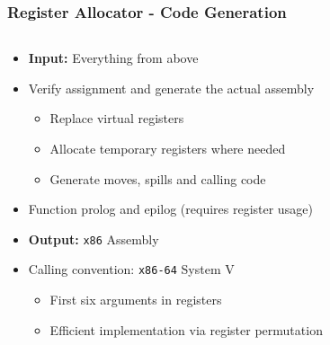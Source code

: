 \documentclass[navbaroff,en]{sdqbeamer}
\begin{document}
\begin{frame}
\frametitle{Register Allocator - Code Generation}

\begin{columns}
	\begin{column}{0.7\textwidth}
		\begin{itemize}
			\item \textbf{Input:} Everything from above
			\item Verify assignment and generate the actual assembly
			\begin{itemize}
				\item Replace virtual registers
				\item Allocate temporary registers where needed
				\item Generate moves, spills and calling code
			\end{itemize}
			\item Function prolog and epilog (requires register usage)
			\item \textbf{Output:} \texttt{x86} Assembly
		\end{itemize}
	
		\vspace{10pt}
		\begin{itemize}
			\item Calling convention: \texttt{x86-64} System V
			\begin{itemize}
				\item First six arguments in registers
				\item Efficient implementation via register permutation
			\end{itemize}
		\end{itemize}
	\end{column}
	

\end{columns}
\end{frame}
\end{document}
